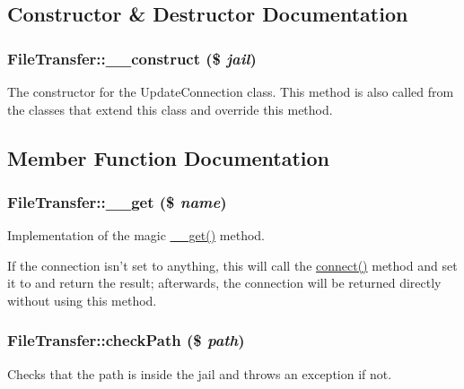 \subsection{Constructor \& Destructor Documentation}
\hypertarget{classFileTransfer_a179fa76ea4a6f5e3206184cc947a3781}{
\subsubsection[{\_\-\_\-construct}]{\setlength{\rightskip}{0pt plus 5cm}FileTransfer::\_\-\_\-construct (\$ {\em jail})}}
\label{classFileTransfer_a179fa76ea4a6f5e3206184cc947a3781}
The constructor for the UpdateConnection class. This method is also called from the classes that extend this class and override this method. 

\subsection{Member Function Documentation}
\hypertarget{classFileTransfer_a78d103c4fac668da6049bfd4ab713b2f}{
\subsubsection[{\_\-\_\-get}]{\setlength{\rightskip}{0pt plus 5cm}FileTransfer::\_\-\_\-get (\$ {\em name})}}
\label{classFileTransfer_a78d103c4fac668da6049bfd4ab713b2f}
Implementation of the magic \hyperlink{classFileTransfer_a78d103c4fac668da6049bfd4ab713b2f}{\_\-\_\-get()} method.

If the connection isn't set to anything, this will call the \hyperlink{classFileTransfer_a78b9b9fdd3029295f73a5a41e052e311}{connect()} method and set it to and return the result; afterwards, the connection will be returned directly without using this method. \hypertarget{classFileTransfer_a1bd7f1c3b5431c3b53236f7aae0c1460}{
\subsubsection[{checkPath}]{\setlength{\rightskip}{0pt plus 5cm}FileTransfer::checkPath (\$ {\em path})}}
\label{classFileTransfer_a1bd7f1c3b5431c3b53236f7aae0c1460}
Checks that the path is inside the jail and throws an exception if not.


